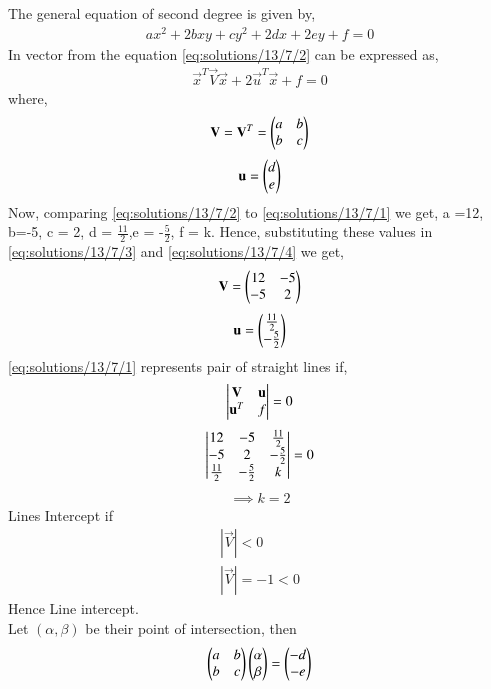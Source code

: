 The general equation of second degree is given by,
\begin{align}
ax^2 + 2bxy + cy^2 + 2dx +2ey +f = 0
\label{eq:solutions/13/7/2}
\end{align}
In vector from the equation \eqref{eq:solutions/13/7/2} can be expressed as,
\begin{align}
\vec{x}^T\vec{V}\vec{x} + 2\vec{u}^T\vec{x} + f = 0 
\label{eq:solutions/13/7/line_vec}
\end{align}
where,
\begin{align}
\mathbf{V} = \mathbf{V}^T = \begin{pmatrix}a&b\\b&c\end{pmatrix}
\label{eq:solutions/13/7/3}
\end{align}
\begin{align}
\mathbf{u} = \begin{pmatrix}d\\e\end{pmatrix}
\label{eq:solutions/13/7/4}
\end{align}
Now, comparing \eqref{eq:solutions/13/7/2} to \eqref{eq:solutions/13/7/1} we get, a =12, b=-5, c = 2, d = $\frac{11}{2}$,e = -$\frac{5}{2}$, f = k.  
Hence, substituting these values in \eqref{eq:solutions/13/7/3} and \eqref{eq:solutions/13/7/4} we get,
\begin{align}
\mathbf{V} = \begin{pmatrix}12 & -5 \\ -5 & 2\end{pmatrix}
\end{align}
\begin{align}
\mathbf{u} = \begin{pmatrix}\frac{11}{2} \\ -\frac{5}{2}\end{pmatrix}
\end{align}
\eqref{eq:solutions/13/7/1} represents pair of straight lines if,
\begin{align}
\begin{vmatrix}\mathbf{V}&\mathbf{u}\\\mathbf{u}^T&f\end{vmatrix} = 0
\end{align}
\begin{align}
\begin{vmatrix}12&-5&\frac{11}{2}\\-5&2&-\frac{5}{2}\\\frac{11}{2}&-\frac{5}{2}&k\end{vmatrix} = 0
\end{align}
\begin{align}
\implies k =2
\label{eq:solutions/13/7/5}
\end{align}
Lines Intercept if
\begin{align}
    |\vec{V}|<0\\
    |\vec{V}|=-1<0
\end{align}
Hence Line intercept.\\
Let $(\alpha,\beta)$ be their point of intersection, then
\begin{equation}\label{eq:solutions/13/7/eq6}
	\begin{pmatrix} a & b\\ b & c\end{pmatrix}\begin{pmatrix}\alpha \\ \beta\end{pmatrix} = \begin{pmatrix}-d \\ -e\end{pmatrix}
\end{equation}
